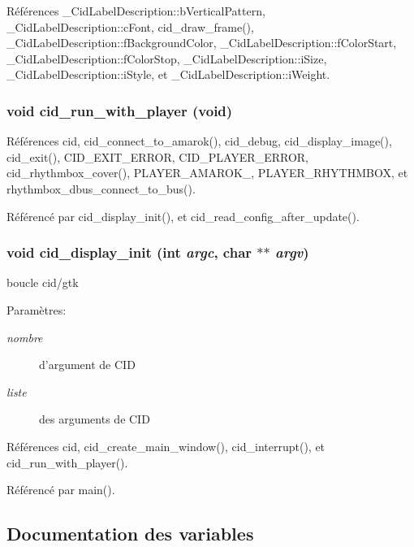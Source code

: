 Références \_\-CidLabelDescription::bVerticalPattern, \_\-CidLabelDescription::cFont, cid\_\-draw\_\-frame(), \_\-CidLabelDescription::fBackgroundColor, \_\-CidLabelDescription::fColorStart, \_\-CidLabelDescription::fColorStop, \_\-CidLabelDescription::iSize, \_\-CidLabelDescription::iStyle, et \_\-CidLabelDescription::iWeight.
\subsubsection{\setlength{\rightskip}{0pt plus 5cm}void cid\_\-run\_\-with\_\-player (void)}\label{cid-main_8c_1e6817e5dd18868b1850d32b40d54adb}




Références cid, cid\_\-connect\_\-to\_\-amarok(), cid\_\-debug, cid\_\-display\_\-image(), cid\_\-exit(), CID\_\-EXIT\_\-ERROR, CID\_\-PLAYER\_\-ERROR, cid\_\-rhythmbox\_\-cover(), PLAYER\_\-AMAROK\_, PLAYER\_\-RHYTHMBOX, et rhythmbox\_\-dbus\_\-connect\_\-to\_\-bus().

Référencé par cid\_\-display\_\-init(), et cid\_\-read\_\-config\_\-after\_\-update().
\subsubsection{\setlength{\rightskip}{0pt plus 5cm}void cid\_\-display\_\-init (int {\em argc}, \/  char $\ast$$\ast$ {\em argv})}\label{cid-main_8c_6d1ca9236cd558391793807b8e817130}


boucle cid/gtk \begin{Desc}
\item[Paramètres:]
\begin{description}
\item[{\em nombre}]d'argument de CID \item[{\em liste}]des arguments de CID \end{description}
\end{Desc}


Références cid, cid\_\-create\_\-main\_\-window(), cid\_\-interrupt(), et cid\_\-run\_\-with\_\-player().

Référencé par main().

\subsection{Documentation des variables}
